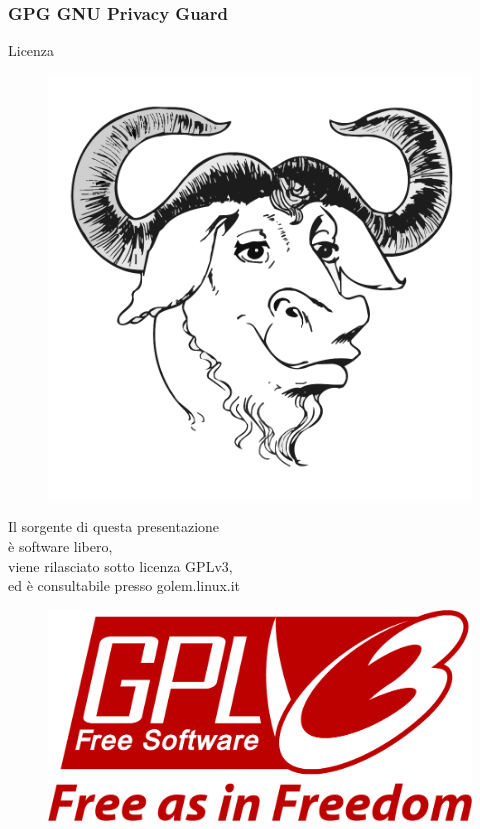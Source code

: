 \documentclass{beamer}
\begin{document}
\begin{frame}
  \frametitle{GPG GNU Privacy Guard}

  \begin{block}{Licenza}
    \centering
    \begin{minipage}{.18\linewidth}
      \begin{figure}
        \centering
        \includegraphics[width=.9\linewidth]{img/gnu.pdf}
      \end{figure}
    \end{minipage}
    \hfill
    \begin{minipage}{.6\linewidth}
      \centering
      Il sorgente di questa presentazione\\
      è software libero,\\
      viene rilasciato sotto licenza GPLv3,\\
      ed è consultabile presso golem.linux.it
    \end{minipage}
    \hfill
    \begin{minipage}{.18\linewidth}
      \begin{figure}
        \centering
        \includegraphics[width=.9\linewidth]{img/gpl3.pdf}
      \end{figure}
    \end{minipage}


\end{block}
\end{frame}
\end{document}
